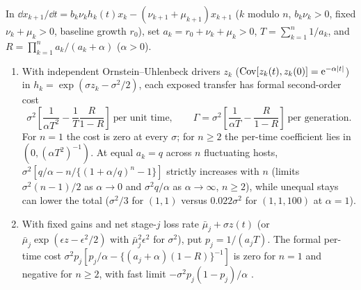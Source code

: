 \begin{proposition}\label{prop:ring-ct}
In $\dd x_{k+1}/\dd t = b_k\nu_k h_k(t) x_k - (\nu_{k+1} + \mu_{k+1}) x_{k+1}$ ($k$ modulo $n$, $b_k\nu_k > 0$, fixed $\nu_k + \mu_k > 0$, baseline growth $r_0$), set $a_k = r_0 + \nu_k + \mu_k > 0$, $T = \sum_{k=1}^n 1/a_k$, and $R = \prod_{k=1}^n a_k/(a_k + \alpha)$ ($\alpha > 0$).
\begin{enumerate}
\item[(a)] With independent Ornstein--Uhlenbeck drivers $z_k$ ($\operatorname{Cov}[z_k(t), z_k(0)] = \mathrm{e}^{-\alpha|t|}$) in $h_k = \exp(\sigma z_k - \sigma^2/2)$, each exposed transfer has formal second-order cost
\begin{equation}
\sigma^2\left[\frac{1}{\alpha T^2} - \frac{1}{T}\frac{R}{1 - R}\right] \ \text{per unit time}, \qquad \Gamma = \sigma^2\left[\frac{1}{\alpha T} - \frac{R}{1 - R}\right] \ \text{per generation}.
\label{eq:ring-ct}
\end{equation}
For $n = 1$ the cost is zero at every $\sigma$; for $n \ge 2$ the per-time coefficient lies in $(0, (\alpha T^2)^{-1})$. At equal $a_k = q$ across $n$ fluctuating hosts, $\sigma^2[q/\alpha - n/\{(1 + \alpha/q)^n - 1\}]$ strictly increases with $n$ (limits $\sigma^2(n - 1)/2$ as $\alpha \to 0$ and $\sigma^2 q/\alpha$ as $\alpha \to \infty$, $n \ge 2$), while unequal stays can lower the total ($\sigma^2/3$ for $(1,1)$ versus $0.022\sigma^2$ for $(1,1,100)$ at $\alpha = 1$).
\item[(b)] With fixed gains and net stage-$j$ loss rate $\bar{\mu}_j + \sigma z(t)$ (or $\bar{\mu}_j\exp(\epsilon z - \epsilon^2/2)$ with $\bar{\mu}_j^2\epsilon^2$ for $\sigma^2$), put $p_j = 1/(a_j T)$. The formal per-time cost $\sigma^2 p_j [p_j/\alpha - \{(a_j + \alpha)(1 - R)\}^{-1}]$ is zero for $n = 1$ and negative for $n \ge 2$, with fast limit $-\sigma^2 p_j(1 - p_j)/\alpha$ \citep{monmarche2025}.
\end{enumerate}
\end{proposition}

